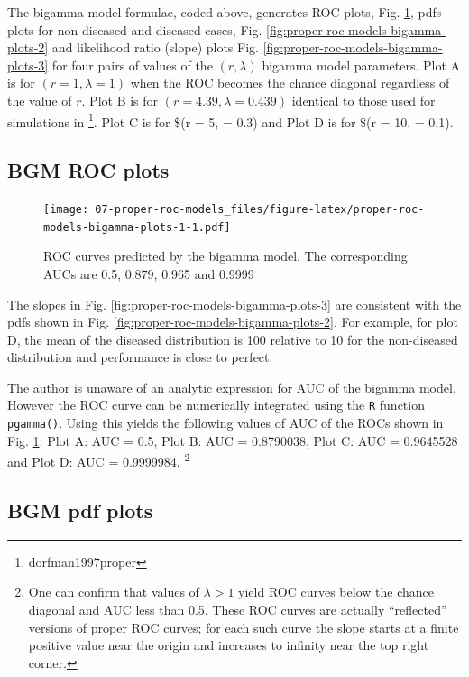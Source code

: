 \documentclass[
]{book}
\begin{document}
The bigamma-model formulae, coded above, generates ROC plots, Fig. \ref{fig:proper-roc-models-bigamma-plots-1}, pdfs plots for non-diseased and diseased cases, Fig. \ref{fig:proper-roc-models-bigamma-plots-2} and likelihood ratio (slope) plots Fig. \ref{fig:proper-roc-models-bigamma-plots-3} for four pairs of values of the \((r, \lambda)\) bigamma model parameters. Plot A is for \((r = 1, \lambda = 1)\) when the ROC becomes the chance diagonal regardless of the value of \(r\). Plot B is for \((r = 4.39, \lambda = 0.439)\) identical to those used for simulations in \footnote{dorfman1997proper}. Plot C is for \$(r = 5, \lambda = 0.3) and Plot D is for \$(r = 10, \lambda = 0.1).

\hypertarget{proper-roc-models-bigamma-rocs}{%
\subsection{BGM ROC plots}\label{proper-roc-models-bigamma-rocs}}

\begin{figure}
\centering
\texttt{[image: 07-proper-roc-models\_files/figure-latex/proper-roc-models-bigamma-plots-1-1.pdf]}
\caption{\label{fig:proper-roc-models-bigamma-plots-1}ROC curves predicted by the bigamma model. The corresponding AUCs are 0.5, 0.879, 0.965 and 0.9999}
\end{figure}

The slopes in Fig. \ref{fig:proper-roc-models-bigamma-plots-3} are consistent with the pdfs shown in Fig. \ref{fig:proper-roc-models-bigamma-plots-2}. For example, for plot D, the mean of the diseased distribution is 100 relative to 10 for the non-diseased distribution and performance is close to perfect.

The author is unaware of an analytic expression for AUC of the bigamma model. However the ROC curve can be numerically integrated using the \texttt{R} function \texttt{pgamma()}. Using this yields the following values of AUC of the ROCs shown in Fig. \ref{fig:proper-roc-models-bigamma-plots-1}: Plot A: AUC = 0.5, Plot B: AUC = 0.8790038, Plot C: AUC = 0.9645528 and Plot D: AUC = 0.9999984. \footnote{One can confirm that values of \(\lambda > 1\) yield ROC curves below the chance diagonal and AUC less than 0.5. These ROC curves are actually ``reflected'' versions of proper ROC curves; for each such curve the slope starts at a finite positive value near the origin and increases to infinity near the top right corner.}

\hypertarget{proper-roc-models-bigamma-pdfs}{%
\subsection{BGM pdf plots}\label{proper-roc-models-bigamma-pdfs}}
\end{document}
